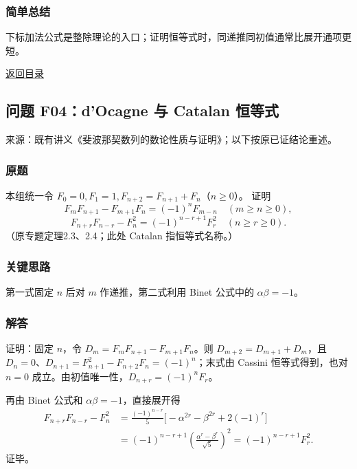 \documentclass[11pt,a4paper]{article}
\begin{document}
\subsubsection{简单总结}\label{ux7b80ux5355ux603bux7ed3-35}

下标加法公式是整除理论的入口；证明恒等式时，同递推同初值通常比展开通项更短。

\noindent\hyperref[contents]{返回目录}

\subsection{问题 F04：d'Ocagne 与 Catalan
恒等式}\label{ux95eeux9898-f04docagne-ux4e0e-catalan-ux6052ux7b49ux5f0f}

来源：既有讲义《斐波那契数列的数论性质与证明》；以下按原已证结论重述。

\subsubsection{原题}\label{ux539fux9898-36}

本组统一令 \(F_0=0,F_1=1,F_{n+2}=F_{n+1}+F_n\)（\(n\ge0\)）。 证明
\[F_mF_{n+1}-F_{m+1}F_n=(-1)^nF_{m-n}\quad(m\ge n\ge0),\]
\[F_{n+r}F_{n-r}-F_n^2=(-1)^{n-r+1}F_r^2\quad(n\ge r\ge0).\]
（原专题定理2.3、2.4；此处 Catalan 指恒等式名称。）

\subsubsection{关键思路}\label{ux5173ux952eux601dux8def-36}

第一式固定 \(n\) 后对 \(m\) 作递推，第二式利用 Binet 公式中的
\(\alpha\beta=-1\)。

\subsubsection{解答}\label{ux89e3ux7b54-36}

证明：固定 \(n\)，令 \(D_m=F_mF_{n+1}-F_{m+1}F_n\)。则
\(D_{m+2}=D_{m+1}+D_m\)，且
\(D_n=0\)、\(D_{n+1}=F_{n+1}^2-F_{n+2}F_n=(-1)^n\)；末式由 Cassini
恒等式得到，也对 \(n=0\) 成立。由初值唯一性，\(D_{n+r}=(-1)^nF_r\)。

再由 Binet 公式和 \(\alpha\beta=-1\)，直接展开得 \[
\begin{aligned}
F_{n+r}F_{n-r}-F_n^2
&=\frac{(-1)^{n-r}}5\bigl[-\alpha^{2r}-\beta^{2r}+2(-1)^r\bigr]\\
&=(-1)^{n-r+1}\left(\frac{\alpha^r-\beta^r}{\sqrt5}\right)^2
=(-1)^{n-r+1}F_r^2.
\end{aligned}
\] 证毕。
\end{document}
